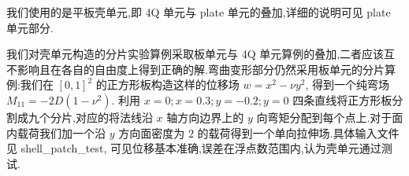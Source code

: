 我们使用的是平板壳单元,即 4Q 单元与 plate 单元的叠加,详细的说明可见 plate 单元部分.

我们对壳单元构造的分片实验算例采取板单元与 4Q 单元算例的叠加,二者应该互不影响且在各自的自由度上得到正确的解.弯曲变形部分仍然采用板单元的分片算例:我们在 $[0,1]^2$ 的正方形板构造这样的位移场 $w=x^2-\nu y^2$, 得到一个纯弯场 $M_{11}=-2D(1-\nu^2)$. 利用 $x=0;x=0.3;y=-0.2;y=0$ 四条直线将正方形板分割成九个分片,对应的将法线沿 $x$ 轴方向边界上的 $y$ 向弯矩分配到每个点上.对于面内载荷我们加一个沿 $y$ 方向面密度为 $2$ 的载荷得到一个单向拉伸场.具体输入文件见 shell\_patch\_test, 可见位移基本准确,误差在浮点数范围内,认为壳单元通过测试.
